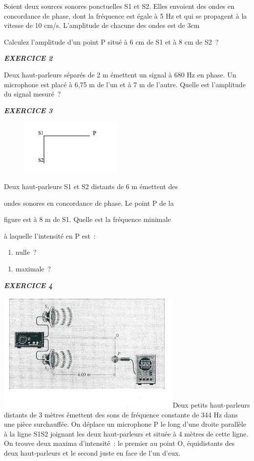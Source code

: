 Soient deux sources sonores ponctuelles S1 et S2. Elles envoient des
ondes en concordance de phase, dont la fréquence est égale à 5 Hz et qui
se propagent à la vitesse de 10 cm/s. L'amplitude de chacune des ondes
est de 3cm

Calculez l'amplitude d'un point P situé à 6 cm de S1 et à 8 cm de S2~?

\emph{\textbf{EXERCICE 2}}

Deux haut-parleurs séparés de 2 m émettent un signal à 680 Hz en phase.
Un microphone est placé à 6,75 m de l'un et à 7 m de l'autre. Quelle est
l'amplitude du signal mesuré~?

\emph{\textbf{EXERCICE 3}}

\begin{figure}
\centering
\includegraphics[width=5.151cm,height=2.729cm]{Pictures/10000001000000BC000000630AF71C86AA2A0A65.png}
\caption{}
\end{figure}

Deux haut-parleurs S1 et S2 distants de 6 m émettent des

ondes sonores en concordance de phase. Le point P de la

figure est à 8 m de S1. Quelle est la fréquence minimale

à laquelle l'intensité en P est~:

\begin{enumerate}
\def\labelenumi{\alph{enumi})}
\tightlist
\item
  nulle~?
\end{enumerate}

\begin{enumerate}
\def\labelenumi{\alph{enumi})}
\tightlist
\item
  maximale~?
\end{enumerate}

\emph{\textbf{EXERCICE 4}}

\includegraphics[width=9.146cm,height=5.973cm]{Pictures/100000010000062500000404B4675BF2C4CE1EEC.png}Deux
petits haut-parleurs distants de 3 mètres émettent des sons de fréquence
constante de 344 Hz dans une pièce surchauffée. On déplace un microphone
P le long d'une droite parallèle à la ligne S1S2 joignant les deux
haut-parleurs et située à 4 mètres de cette ligne. On trouve deux maxima
d'intensité~: le premier au point O, équidistants des deux haut-parleurs
et le second juste en face de l'un d'eux.

